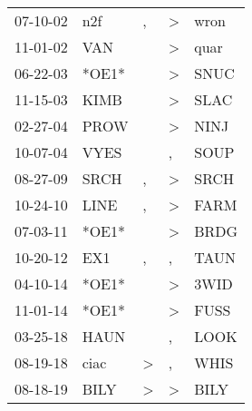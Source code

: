 \begin{supertabular}{p{0.07\textwidth}p{0.06\textwidth}p{0.02\textwidth}p{0.02\textwidth}p{0.06\textwidth}}
 07-10-02\textsuperscript{} &   n2f\textsuperscript{} &             , &  \textgreater &  wron\textsuperscript{} \\
 11-01-02\textsuperscript{} &   VAN\textsuperscript{} &               &  \textgreater &  quar\textsuperscript{} \\
 06-22-03\textsuperscript{} &                   *OE1* &               &  \textgreater &  SNUC\textsuperscript{} \\
 11-15-03\textsuperscript{} &  KIMB\textsuperscript{} &               &  \textgreater &  SLAC\textsuperscript{} \\
 02-27-04\textsuperscript{} &  PROW\textsuperscript{} &               &  \textgreater &  NINJ\textsuperscript{} \\
 10-07-04\textsuperscript{} &  VYES\textsuperscript{} &               &             , &  SOUP\textsuperscript{} \\
 08-27-09\textsuperscript{} &  SRCH\textsuperscript{} &             , &  \textgreater &  SRCH\textsuperscript{} \\
 10-24-10\textsuperscript{} &  LINE\textsuperscript{} &             , &  \textgreater &  FARM\textsuperscript{} \\
 07-03-11\textsuperscript{} &                   *OE1* &               &  \textgreater &  BRDG\textsuperscript{} \\
 10-20-12\textsuperscript{} &   EX1\textsuperscript{} &             , &             , &  TAUN\textsuperscript{} \\
 04-10-14\textsuperscript{} &                   *OE1* &               &  \textgreater &  3WID\textsuperscript{} \\
 11-01-14\textsuperscript{} &                   *OE1* &               &  \textgreater &  FUSS\textsuperscript{} \\
 03-25-18\textsuperscript{} &  HAUN\textsuperscript{} &               &             , &  LOOK\textsuperscript{} \\
 08-19-18\textsuperscript{} &  ciac\textsuperscript{} &  \textgreater &             , &  WHIS\textsuperscript{} \\
 08-18-19\textsuperscript{} &  BILY\textsuperscript{} &  \textgreater &  \textgreater &  BILY\textsuperscript{} \\
\end{supertabular}
